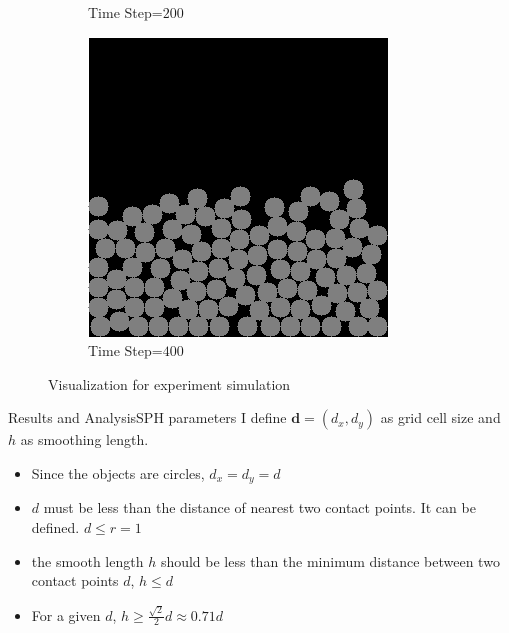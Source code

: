 \documentclass{beamer}
\begin{document}
\begin{frame}
\begin{figure}[!h]
\begin{subfigure}[b]{0.3\textwidth}
            \caption{Time Step=$200$}
        \end{subfigure}
        \begin{subfigure}[b]{0.3\textwidth}
            \includegraphics[width=\textwidth]{../report/Figures/sim3.png}
            \caption{Time Step=$400$}
        \end{subfigure}
        \caption{Visualization for experiment simulation}
        \label{fig:imsim}
\end{figure}
\end{frame}

\begin{frame}{Results and Analysis}{SPH parameters}
I define $\pmb{d}=(d_x, d_y)$ as grid cell size and $h$ as smoothing length.
\begin{itemize}
	\pause
        \item Since the objects are circles, $d_x = d_y = d $ 
	\pause
        \item $d$ must be less than the distance of nearest two contact points. It can be defined. $d \le r = 1$
	\pause
        \item the smooth length $h$ should be less than the minimum distance between two contact points $d$, $h \le d$  
        \pause
	\item For a given $d$, $h \ge \frac{\sqrt{2}}{2}d \approx 0.71 d$
\end{itemize}
\end{frame}
\end{document}
